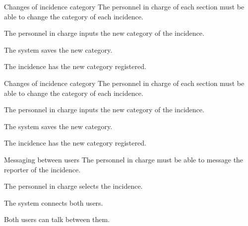 \begin{requirement}{Changes of incidence category}
\reqdesc The personnel in charge of each section must be able to change the category of each incidence.

\reqin The personnel in charge inputs the new category of the incidence.

\reqsteps The system saves the new category.

\reqout The incidence has the new category registered.
\end{requirement}

\begin{requirement}{Changes of incidence category}
\reqdesc The personnel in charge of each section must be able to change the category of each incidence.

\reqin The personnel in charge inputs the new category of the incidence.

\reqsteps The system saves the new category.

\reqout The incidence has the new category registered.
\end{requirement}


\begin{requirement}{Messaging between users}
\reqdesc The personnel in charge must be able to message the reporter of the incidence.

\reqin The personnel in charge selects the incidence.

\reqsteps The system connects both users.

\reqout Both users can talk between them.
\end{requirement}
